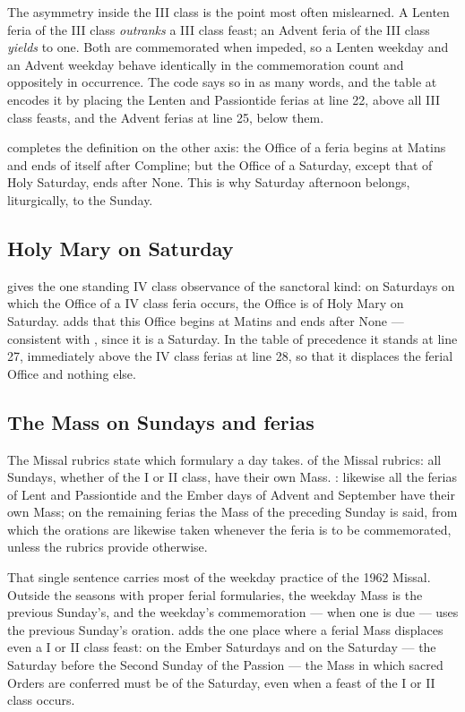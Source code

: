 The asymmetry inside the III class is the point most often mislearned. A Lenten feria of the
III class \emph{outranks} a III class feast; an Advent feria of the III class \emph{yields} to
one. Both are commemorated when impeded, so a Lenten weekday and an Advent weekday behave
identically in the commemoration count and oppositely in occurrence. The code says so in as
many words, and the table at  encodes it by placing the Lenten and Passiontide ferias at
line 22, above all III class feasts, and the Advent ferias at line 25, below them.

 completes the definition on the other axis: the Office of a feria begins at Matins and
ends of itself after Compline; but the Office of a Saturday, except that of Holy Saturday, ends
after None. This is why Saturday afternoon belongs, liturgically, to the Sunday.

\subsection{Holy Mary on Saturday}

 gives the one standing IV class observance of the sanctoral kind: on Saturdays on which
the Office of a IV class feria occurs, the Office is of Holy Mary on Saturday.  adds that
this Office begins at Matins and ends after None — consistent with , since it is a
Saturday. In the table of precedence it stands at line 27, immediately above the IV class ferias
at line 28, so that it displaces the ferial Office and nothing else.

\subsection{The Mass on Sundays and ferias}

The Missal rubrics state which formulary a day takes.  of the Missal rubrics: all
Sundays, whether of the I or II class, have their own Mass. : likewise all the ferias of
Lent and Passiontide and the Ember days of Advent and September have their own Mass; on the
remaining ferias the Mass of the preceding Sunday is said, from which the orations are likewise
taken whenever the feria is to be commemorated, unless the rubrics provide otherwise.

That single sentence carries most of the weekday practice of the 1962 Missal. Outside the
seasons with proper ferial formularies, the weekday Mass is the previous Sunday's, and the
weekday's commemoration — when one is due — uses the previous Sunday's oration.  adds
the one place where a ferial Mass displaces even a I or II class feast: on the Ember Saturdays
and on the Saturday  — the Saturday before the Second Sunday of the Passion —
the Mass in which sacred Orders are conferred must be of the Saturday, even when a feast of the
I or II class occurs.
